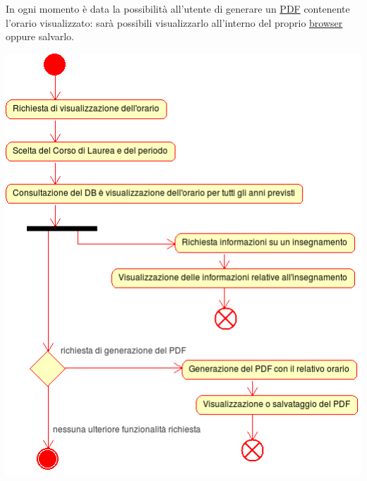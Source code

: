 \documentclass[11pt,a4paper]{article}
\begin{document}
In ogni momento è data la possibilità all'utente di generare un \underline{PDF} contenente l'orario visualizzato: sarà possibili visualizzarlo all'interno del proprio \underline{browser} oppure salvarlo.
\begin{center}
 \includegraphics[scale=0.85]{images/consultazione_orario.png}
\end{center}
\end{document}

